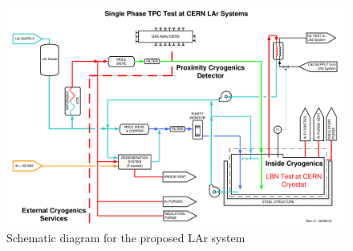 \begin{figure}
\begin{center}
\includegraphics[width=.75\textwidth]{figures/proposed-LAr-system} %
\caption[Schematic diagram for the proposed LAr system]{\label{fig:proposed-LAr-system} Schematic diagram for the proposed LAr system}
\end{center}
\end{figure}


